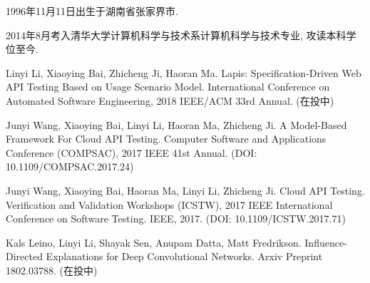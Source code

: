 \begin{resume}


    1996年11月11日出生于湖南省张家界市.
    
    2014年8月考入清华大学计算机科学与技术系计算机科学与技术专业, 攻读本科学位至今.


  \begin{publications}
    \item Linyi Li, Xiaoying Bai, Zhicheng Ji, Haoran Ma. Lapis: Specification-Driven Web API Testing Based on Usage Scenario Model. International Conference on Automated Software Engineering, 2018 IEEE/ACM 33rd Annual. (在投中)
  
    \item Junyi Wang, Xiaoying Bai, Linyi Li, Haoran Ma, Zhicheng Ji. A Model-Based Framework For Cloud API Testing. Computer Software and Applications Conference (COMPSAC), 2017 IEEE 41st Annual.  (DOI: 10.1109/COMPSAC.2017.24)
    
    \item Junyi Wang, Xiaoying Bai, Haoran Ma, Linyi Li, Zhicheng Ji. Cloud API Testing. Verification and Validation Workshops (ICSTW), 2017 IEEE International Conference on Software Testing. IEEE, 2017. (DOI: 10.1109/ICSTW.2017.71)
  
    \item  Kals Leino, Linyi Li, Shayak Sen, Anupam Datta, Matt Fredrikson. Influence-Directed Explanations for Deep Convolutional Networks. Arxiv Preprint 1802.03788. (在投中)
  
  \end{publications}

\end{resume}
